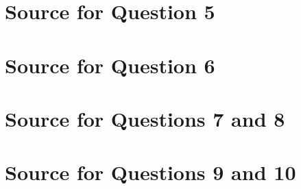 \documentclass[letterpaper,11pt]{article}
\begin{document}


\clearpage
\appendix
\section{Source for Question 5}



\clearpage
\appendix
\section{Source for Question 6}



\clearpage
\appendix
\section{Source for Questions 7 and 8}



\clearpage
\appendix
\section{Source for Questions 9 and 10}



\clearpage


\end{document}
